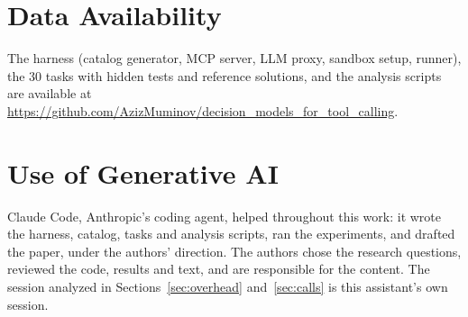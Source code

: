 \documentclass[conference]{IEEEtran}
\newif\ifanon
\newcommand{\artifact}{\ifanon\url{https://anonymous.4open.science/r/XXXX}\else\url{https://github.com/AzizMuminov/decision_models_for_tool_calling}\fi}
\begin{document}
\section*{Data Availability}
The harness (catalog generator, MCP server, LLM proxy, sandbox setup, runner), the 30 tasks with hidden tests
and reference solutions, and the analysis scripts are available at \artifact.

\section*{Use of Generative AI}
Claude Code, Anthropic's coding agent, helped throughout this work: it wrote the harness, catalog, tasks and
analysis scripts, ran the experiments, and drafted the paper, under the authors' direction. The authors chose
the research questions, reviewed the code, results and text, and are responsible for the content. The session
analyzed in Sections~\ref{sec:overhead} and~\ref{sec:calls} is this assistant's own session.



\end{document}
